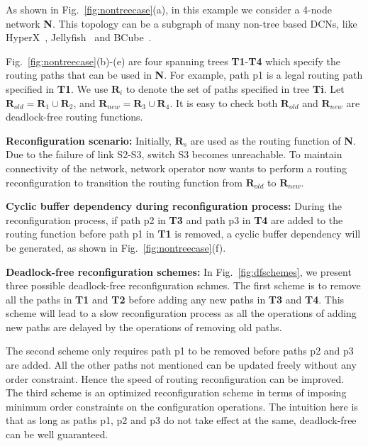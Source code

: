 As shown in Fig.~\ref{fig:nontreecase}(a), in this example we consider a 4-node network \textbf{N}. This topology can be a subgraph of many non-tree based DCNs, like HyperX~\cite{hyperx}, Jellyfish~\cite{jellyfish} and BCube~\cite{bcube}.

Fig.~\ref{fig:nontreecase}(b)-(e) are four spanning trees \textbf{T1}-\textbf{T4} which specify the routing paths that can be used in \textbf{N}. For example, path p1 is a legal routing path specified in \textbf{T1}.  We use $\textbf{R}_i$ to denote the set of paths specified in tree \textbf{Ti}. Let $\textbf{R}_{old} = \textbf{R}_1 \cup \textbf{R}_2$, and $\textbf{R}_{new} = \textbf{R}_3 \cup \textbf{R}_4$. It is easy to check both $\textbf{R}_{old}$ and $\textbf{R}_{new}$ are deadlock-free routing functions. 

\textbf{Reconfiguration scenario:} Initially, $\textbf{R}_s$ are used as the routing function of \textbf{N}. Due to the failure of link S2-S3, switch S3 becomes unreachable. To maintain connectivity of the network, network operator now wants to perform a routing reconfiguration to transition the routing function from $\textbf{R}_{old}$ to $\textbf{R}_{new}$.

\textbf{Cyclic buffer dependency during reconfiguration process:} During the reconfiguration process, if path p2 in \textbf{T3} and path p3 in \textbf{T4} are added to the routing function before path p1 in \textbf{T1} is removed, a cyclic buffer dependency will be generated, as shown in Fig.~\ref{fig:nontreecase}(f).

\textbf{Deadlock-free reconfiguration schemes:} In Fig.~\ref{fig:dfschemes}, we present three possible deadlock-free reconfiguration schmes. The first scheme is to remove all the paths in \textbf{T1} and \textbf{T2} before adding any new paths in \textbf{T3} and \textbf{T4}. This scheme will lead to a slow reconfiguration process as all the operations of adding new paths are delayed by the operations of removing old paths. 

The second scheme only requires path p1 to be removed before paths p2 and p3 are added. All the other paths not mentioned can be updated freely without any order constraint. Hence the speed of routing reconfiguration can be improved. The third scheme is an optimized reconfiguration scheme in terms of imposing minimum order constraints on the configuration operations. The intuition here is that as long as paths p1, p2 and p3 do not take effect at the same, deadlock-free can be well guaranteed. 

